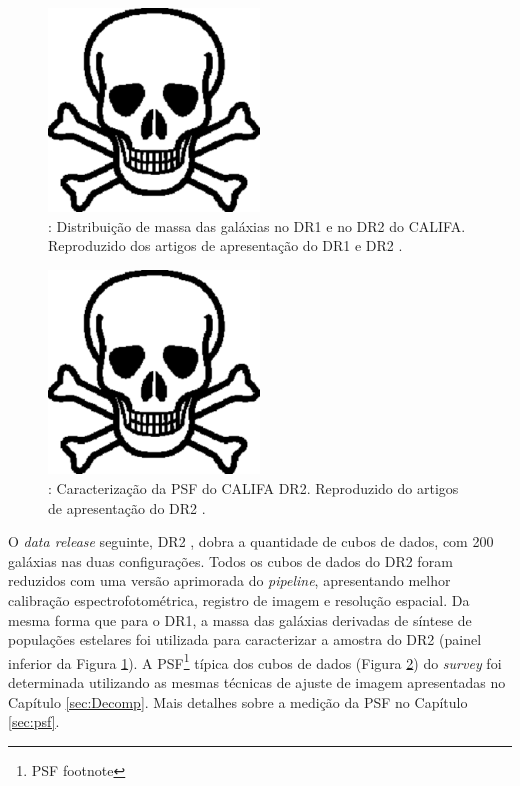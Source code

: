 \begin{figure}
	\includegraphics[width=0.5\textwidth]{figuras/test.pdf}
	\caption[Distribuição de massa das galáxias (CALIFA DR1 e DR2).]
	{\TODO: Distribuição de massa das galáxias no DR1 e no DR2 do CALIFA.
	Reproduzido dos artigos de apresentação do DR1 \citep[figura 6]{Husemann2013}
	e DR2 \citep[figura 7]{GarciaBenito2015}.}
	\label{fig:DRMass}
\end{figure}

\begin{figure}
	\includegraphics[width=0.5\textwidth]{figuras/test.pdf}
	\caption[Caracterização da PSF do CALIFA DR2.]
	{\TODO: Caracterização da PSF do CALIFA DR2.
	Reproduzido do artigos de apresentação do DR2 \citep[figura
	13]{GarciaBenito2015}.}
	\label{fig:DR2PSF}
\end{figure}

O {\em data release} seguinte, DR2 \citep{GarciaBenito2015}, dobra a quantidade
de cubos de dados, com 200 galáxias nas duas configurações. Todos os cubos de
dados do DR2 foram reduzidos com uma versão aprimorada do {\em pipeline}\fixme,
apresentando melhor calibração espectrofotométrica\fixme, registro de imagem e
resolução espacial. Da mesma forma que para o DR1, a massa das galáxias
derivadas de síntese de populações estelares foi utilizada para caracterizar a
amostra do DR2 (painel inferior da Figura \ref{fig:DRMass}). A
PSF\footnote{\TODO PSF footnote} típica dos cubos de dados (Figura
\ref{fig:DR2PSF}) do {\em survey} foi determinada utilizando as mesmas técnicas
de ajuste de imagem apresentadas no Capítulo \ref{sec:Decomp}. Mais detalhes
sobre a medição da PSF no Capítulo \ref{sec:psf}.

